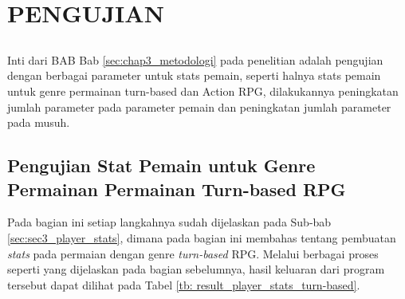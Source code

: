 \chapter{PENGUJIAN}
\label{sec:chap4_pengujian}
\vspace{1ex}

\section*{}
Inti dari BAB Bab \ref{sec:chap3_metodologi} pada penelitian adalah pengujian dengan berbagai parameter untuk stats pemain, seperti halnya stats pemain untuk genre permainan turn-based dan Action RPG, dilakukannya peningkatan jumlah parameter pada parameter pemain dan peningkatan jumlah parameter pada musuh.
\vspace{1ex}

\section{Pengujian Stat Pemain untuk Genre Permainan Permainan Turn-based RPG}
\label{sec:sec4_pengujian_turn-based}
\vspace{1ex}

Pada bagian ini setiap langkahnya sudah dijelaskan pada Sub-bab \ref{sec:sec3_player_stats}, dimana pada bagian ini membahas tentang pembuatan \textit{stats} pada permaian dengan genre \textit{turn-based} RPG. Melalui berbagai proses seperti yang dijelaskan pada bagian sebelumnya, hasil keluaran dari program tersebut dapat dilihat pada Tabel \ref{tb: result_player_stats_turn-based}.
\vspace{1ex}

